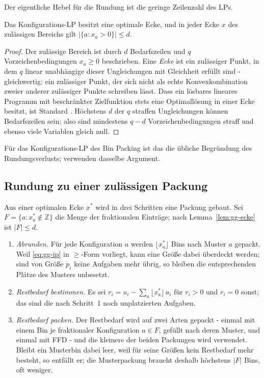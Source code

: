 Der eigentliche Hebel für die Rundung ist die geringe Zeilenzahl des LPs.

\begin{lemma}
\label{lem:gg-ecke}
Das Konfigurations-LP besitzt eine optimale Ecke, und in jeder Ecke $x$ des zulässigen Bereichs
gilt $|\{a : x_a > 0\}| \le d$.
\end{lemma}

\begin{proof}
Der zulässige Bereich ist durch $d$ Bedarfszeilen und $q$ Vorzeichenbedingungen $x_a \ge 0$
beschrieben.
Eine \emph{Ecke} ist ein zulässiger Punkt, in dem $q$ linear unabhängige dieser Ungleichungen mit
Gleichheit erfüllt sind - gleichwertig: ein zulässiger Punkt, der sich nicht als echte
Konvexkombination zweier anderer zulässiger Punkte schreiben lässt.
Dass ein lösbares lineares Programm mit beschränkter Zielfunktion stets eine Optimallösung in einer
Ecke besitzt, ist Standard \cite[Kap.~11]{williamson_shmoys2011}.
Höchstens $d$ der $q$ straffen Ungleichungen können Bedarfszeilen sein; also sind mindestens
$q - d$ Vorzeichenbedingungen straff und ebenso viele Variablen gleich null.
\end{proof}

\noindent
Für das Konfigurations-LP des Bin Packing ist das die übliche Begründung des Rundungsverlusts;
\textcite[Abschnitt~4.6]{williamson_shmoys2011} verwenden dasselbe Argument.

\subsection{Rundung zu einer zulässigen Packung}
\label{sub:gg-rundung}

Aus einer optimalen Ecke $x^\ast$ wird in drei Schritten eine Packung gebaut.
Sei $F = \{a : x^\ast_a \notin \mathbb{Z}\}$ die Menge der fraktionalen Einträge; nach
Lemma~\ref{lem:gg-ecke} ist $|F| \le d$.

\begin{enumerate}[label=\textit{Schritt~\arabic*.}, leftmargin=*, itemsep=3pt]
  \item \emph{Abrunden.} Für jede Konfiguration $a$ werden $\lfloor x^\ast_a \rfloor$ Bins nach
    Muster $a$ gepackt. Weil \eqref{eq:gg-ip} in $\ge$-Form vorliegt, kann eine Größe dabei
    überdeckt werden; sind von Größe $p_i$ keine Aufgaben mehr übrig, so bleiben die
    entsprechenden Plätze des Musters unbesetzt.
  \item \emph{Restbedarf bestimmen.} Es sei
    $r_i = u_i - \sum_{a} \lfloor x^\ast_a \rfloor\, a_i$ für $r_i > 0$ und $r_i = 0$ sonst; das
    sind die nach Schritt~1 noch unplatzierten Aufgaben.
  \item \emph{Restbedarf packen.} Der Restbedarf wird auf zwei Arten gepackt - einmal mit einem
    Bin je fraktionaler Konfiguration $a \in F$, gefüllt nach deren Muster, und einmal mit FFD -
    und die kleinere der beiden Packungen wird verwendet.
    Bleibt ein Musterbin dabei leer, weil für seine Größen kein Restbedarf mehr besteht, so
    entfällt er; die Musterpackung braucht deshalb höchstens $|F|$ Bins, oft weniger.
\end{enumerate}


